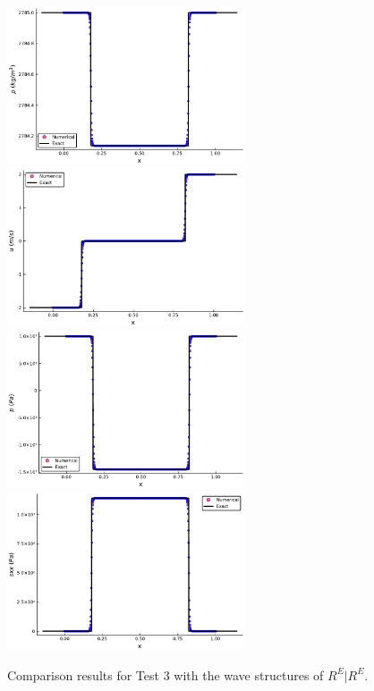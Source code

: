 \documentclass{article}
\numberwithin{equation}{section}
\numberwithin{table}{section}
\begin{document}
\begin{figure}[ht]
  \centering

  \includegraphics[width= 7cm] {case4rho.pdf}
  \includegraphics[width= 7cm] {case4u.pdf}
  \includegraphics[width= 7cm] {case4p.pdf}
  \includegraphics[width= 7cm] {case4sxx.pdf}

    \caption{Comparison results for Test 3 with the wave structures of $R^E|R^E$.  }
  \label{fig:case3}
\end{figure}
\end{document}
